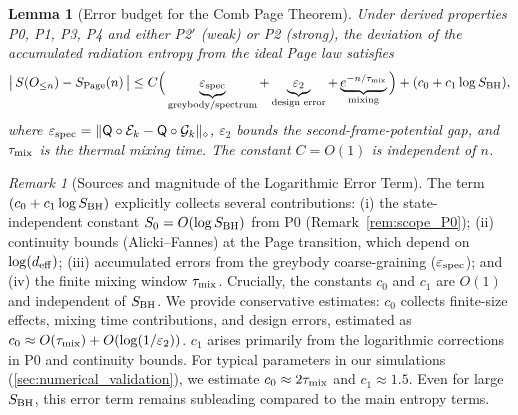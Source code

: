 \documentclass[a4paper,11pt]{article}
\theoremstyle{plain}
\newtheorem{lemma}{Lemma}
\theoremstyle{definition}
\theoremstyle{remark}
\newtheorem{remark}{Remark}
\begin{document}
\begin{lemma}[Error budget for the Comb Page Theorem]
\label{lem:comb-error-budget}
Under derived properties P0, P1, P3, P4 and either P2$'$ (weak) or P2 (strong),
the deviation of the accumulated radiation entropy from the ideal Page law satisfies
\[
\big|\,S(O_{\le n}) - S_{\rm Page}(n)\,\big|
\le C\Big( \underbrace{\varepsilon_{\rm spec}}_{\text{greybody/spectrum}} 
+ \underbrace{\varepsilon_2}_{\text{design error}}
+ \underbrace{e^{-n/\tau_{\rm mix}}}_{\text{mixing}} \Big)
+ (c_0 + c_1\log S_{\rm BH}),
\]
where $\varepsilon_{\rm spec}=\|\mathsf{Q}\circ \mathcal{E}_k - \mathsf{Q}\circ \mathcal{G}_k\|_\diamond$,
$\varepsilon_2$ bounds the second-frame-potential gap, and $\tau_{\rm mix}$ is the thermal mixing time.
The constant $C=O(1)$ is independent of $n$.
\end{lemma}
\begin{remark}[Sources and magnitude of the Logarithmic Error Term]
\label{rem:log_error_sources}
The term $(c_0 + c_1\log S_{\rm BH})$ explicitly collects several contributions: (i) the state-independent constant $S_0=O(\log S_{\rm BH})$ from P0 (Remark~\ref{rem:scope_P0}); (ii) continuity bounds (Alicki--Fannes) at the Page transition, which depend on $\log(d_{\rm eff})$; (iii) accumulated errors from the greybody coarse-graining ($\varepsilon_{\rm spec}$); and (iv) the finite mixing window $\tau_{\rm mix}$.
Crucially, the constants $c_0$ and $c_1$ are $O(1)$ and independent of $S_{\rm BH}$. We provide conservative estimates: $c_0$ collects finite-size effects, mixing time contributions, and design errors, estimated as $c_0 \approx O(\tau_{\rm mix}) + O(\log(1/\varepsilon_2))$. $c_1$ arises primarily from the logarithmic corrections in P0 and continuity bounds. For typical parameters in our simulations (\cref{sec:numerical_validation}), we estimate $c_0 \approx 2\tau_{\rm mix}$ and $c_1 \approx 1.5$. Even for large $S_{\rm BH}$, this error term remains subleading compared to the main entropy terms.
\end{remark}
\end{document}
